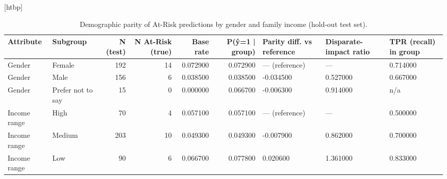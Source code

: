 \begin{table}
\small[htbp]
\caption{Demographic parity of At-Risk predictions by gender and family income (hold-out test set).}
\label{tab:T13_demographic_parity}
\begin{tabular}{llrrrrlll}
\toprule
Attribute & Subgroup & N (test) & N At-Risk (true) & Base rate & P(ŷ=1 | group) & Parity diff. vs reference & Disparate-impact ratio & TPR (recall) in group \\
\midrule
Gender & Female & 192 & 14 & 0.072900 & 0.072900 & — (reference) & — & 0.714000 \\
Gender & Male & 156 & 6 & 0.038500 & 0.038500 & -0.034500 & 0.527000 & 0.667000 \\
Gender & Prefer not to say & 15 & 0 & 0.000000 & 0.066700 & -0.006300 & 0.914000 & n/a \\
Income range & High & 70 & 4 & 0.057100 & 0.057100 & — (reference) & — & 0.500000 \\
Income range & Medium & 203 & 10 & 0.049300 & 0.049300 & -0.007900 & 0.862000 & 0.700000 \\
Income range & Low & 90 & 6 & 0.066700 & 0.077800 & 0.020600 & 1.361000 & 0.833000 \\
\bottomrule
\end{tabular}
\end{table}
